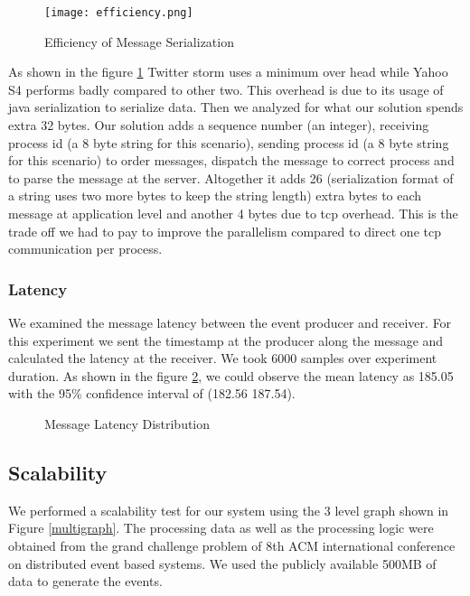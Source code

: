 \begin{figure}[!t]
        \centering
        \texttt{[image: efficiency.png]}

        \caption{Efficiency of Message Serialization}
        \label{efficiency}
\end{figure}

As shown in the figure \ref{efficiency} Twitter storm\cite{twitterStorm} uses a minimum over head while Yahoo S4\cite{neumeyer2010s4} performs badly compared to other two. This overhead is due to its usage of  java serialization to serialize data. Then we analyzed for what our solution spends extra 32 bytes. Our solution adds a sequence number (an integer), receiving process id (a 8 byte string for this scenario), sending process id (a 8 byte string for this scenario) to order messages, dispatch the message to correct process and to parse the message at the server. Altogether it adds 26 (serialization format of a string uses two more bytes to keep the string length) extra bytes to each message at application level and another 4 bytes due to tcp overhead. This is the trade off we had to pay to improve the parallelism compared to direct one tcp communication per process. 

\subsubsection{Latency}
We examined the message latency between the event producer and receiver. For this experiment we sent the timestamp at the producer along the message and calculated the latency at the receiver. We took 6000 samples over experiment duration. As shown in the figure \ref{latancydis}, we could observe the mean latency as 185.05 with the 95\% confidence interval of (182.56 187.54). 

\begin{figure}[!t]
        \centering
        \hfil
        \caption{Message Latency Distribution}
        \label{latancydis}
\end{figure}


\subsection{Scalability}
We performed a scalability test for our system using the 3 level graph shown in Figure \ref{multigraph}. The processing data as well as the processing logic were obtained from the grand challenge problem of 8th ACM international conference on distributed event based systems. We used the publicly available 500MB of data to generate the events. 

